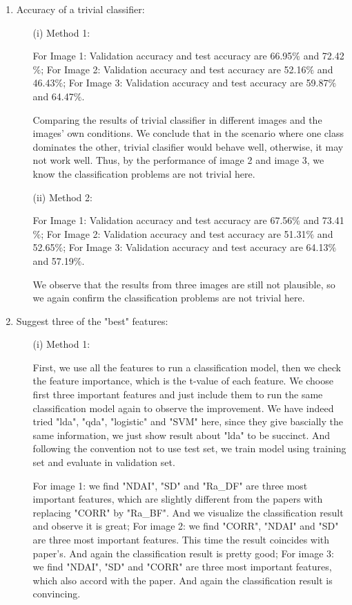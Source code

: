 \documentclass[11pt]{article}
\begin{document}
\begin{enumerate}[label=(\alph*)]
\item Accuracy of a trivial classifier:
\begin{enumerate}
\item[(i)] Method 1:

\quad For Image 1: Validation accuracy and test accuracy are 66.95$\%$ and 72.42$\%$; For Image 2: Validation accuracy and test accuracy are 52.16$\%$ and 46.43$\%$; For Image 3: Validation accuracy and test accuracy are 59.87$\%$ and 64.47$\%$.\par
\quad Comparing the results of trivial classifier in different images and the images' own conditions. We conclude that in the scenario where one class dominates the other, trivial clasifier would behave well, otherwise, it may not work well. Thus, by the performance of image 2 and image 3, we know the classification problems are not trivial here.

\item[(ii)]  Method 2:

\quad For Image 1: Validation accuracy and test accuracy are 67.56$\%$ and 73.41$\%$; For Image 2: Validation accuracy and test accuracy are 51.31$\%$ and 52.65$\%$; For Image 3: Validation accuracy and test accuracy are 64.13$\%$ and 57.19$\%$.\par
\quad We observe that the results from three images are still not plausible, so we again confirm the classification problems are not trivial here.
\end{enumerate}

\item Suggest three of the "best" features:
\begin{enumerate}
\item[(i)] Method 1:

\quad First, we use all the features to run a classification model, then we check the feature importance, which is the t-value of each feature. We choose first three important features and just include them to run the same classification model again to observe the improvement. We have indeed tried "lda", "qda", "logistic" and "SVM" here, since they give bascially the same information, we just show result about "lda" to be succinct. And following the convention not to use test set, we train model using training set and evaluate in validation set. \par
\quad For image 1: we find "NDAI", "SD" and "Ra\_DF" are three most important features, which are slightly different from the papers with replacing "CORR" by "Ra\_BF". And we visualize the classification result and observe it is great; For image 2: we find "CORR", "NDAI" and "SD" are three most important features. This time the result coincides with paper's. And again the classification result is pretty good; For image 3: we find "NDAI", "SD" and "CORR" are three most important features, which also accord with the paper. And again the classification result is convincing.


\end{enumerate}
\end{enumerate}
\end{document}
